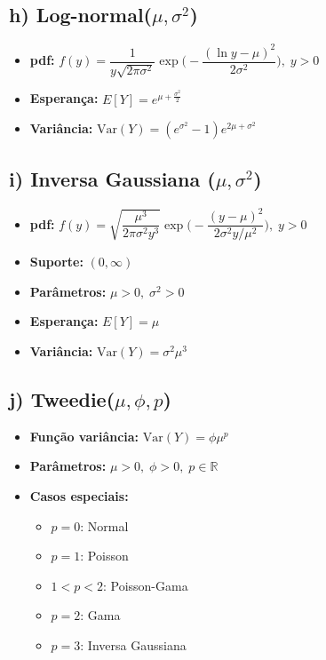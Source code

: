\documentclass[a4paper,12pt]{article}
\begin{document}
\subsection*{h) Log-normal($\mu,\sigma^2$)}
\begin{itemize}
\item \textbf{pdf:} $f(y)=\dfrac{1}{y\sqrt{2\pi\sigma^2}}\exp\!\Big(-\dfrac{(\ln y-\mu)^2}{2\sigma^2}\Big),\; y>0$
\item \textbf{Esperança:} $E[Y]=e^{\mu+\frac{\sigma^2}{2}}$
\item \textbf{Variância:} $\mathrm{Var}(Y)=(e^{\sigma^2}-1)e^{2\mu+\sigma^2}$
\end{itemize}

\subsection*{i) Inversa Gaussiana ($\mu,\sigma^2$)}
\begin{itemize}
\item \textbf{pdf:} $f(y)=\sqrt{\dfrac{\mu^3}{2\pi\sigma^2 y^3}}\exp\!\Big(-\dfrac{(y-\mu)^2}{2\sigma^2 y/\mu^2}\Big),\; y>0$
\item \textbf{Suporte:} $(0,\infty)$
\item \textbf{Parâmetros:} $\mu>0,\;\sigma^2>0$
\item \textbf{Esperança:} $E[Y]=\mu$
\item \textbf{Variância:} $\mathrm{Var}(Y)=\sigma^2\mu^3$
\end{itemize}

\subsection*{j) Tweedie($\mu,\phi,p$)}
\begin{itemize}
\item \textbf{Função variância:} $\mathrm{Var}(Y)=\phi\mu^{p}$
\item \textbf{Parâmetros:} $\mu>0,\;\phi>0,\;p\in\mathbb{R}$
\item \textbf{Casos especiais:} 
\begin{itemize}
\item $p=0$: Normal
\item $p=1$: Poisson
\item $1<p<2$: Poisson-Gama
\item $p=2$: Gama
\item $p=3$: Inversa Gaussiana
\end{itemize}
\end{itemize}
\end{document}
